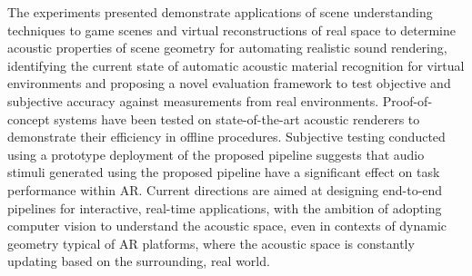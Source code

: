 The experiments presented demonstrate applications of scene understanding techniques to game scenes and virtual reconstructions of real space to determine acoustic properties of scene geometry for automating realistic sound rendering, identifying the current state of automatic acoustic material recognition for virtual environments and proposing a novel evaluation framework to test objective and subjective accuracy against measurements from real environments. Proof-of-concept systems have been tested on state-of-the-art acoustic renderers to demonstrate their efficiency in offline procedures. Subjective testing conducted using a prototype deployment of the proposed pipeline suggests that audio stimuli generated using the proposed pipeline have a significant effect on task performance within AR.
Current directions are aimed at designing end-to-end pipelines for interactive, real-time applications, with the ambition of adopting computer vision to understand the acoustic space, even in contexts of dynamic geometry typical of AR platforms, where the acoustic space is constantly updating based on the surrounding, real world.


\afterpreface{} 
